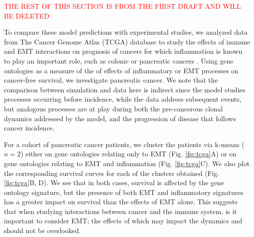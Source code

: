 \documentclass[11pt]{article}
\newcommand{\tcr} { \textcolor{red} }
\begin{document}
\tcr{THE REST OF THIS SECTION IS FROM THE FIRST DRAFT AND WILL BE DELETED}

\par 
To compare these model predictions with experimental studies, we analyzed data from The Cancer Genome Atlas (TCGA) database to study the effects of immune and EMT interactions on prognosis of cancers for which inflammation is known to play an important role, such as colonic or pancreatic cancers \cite{hu10_inflammationinduced, balkwill01_inflammation}. Using gene ontologies as a measure of the of effects of inflammatory or EMT processes on cancer-free survival, we investigate pancreatic cancer. We note that the comparison between simulation and data here is indirect since the model studies processes occurring before incidence, while the data address subsequent events, but analogous processes are at play during both the pre-cancerous clonal dynamics addressed by the model, and the progression of disease that follows cancer incidence. 
\par
For a cohort of pancreatic cancer patients, we cluster the patients via k-means ($n=2$) either on gene ontologies relating only to EMT (Fig. \ref{fig:tcga}A) or on gene ontologies relating to EMT and inflammation (Fig. \ref{fig:tcga}C).
We also plot the corresponding survival curves for each of the clusters obtained (Fig. \ref{fig:tcga}B, D).
We see that in both cases, survival is affected by the gene ontology signature, but the presence of both EMT and inflammatory signatures has a greater impact on survival than the effects of EMT alone.
This suggests that when studying interactions between cancer and the immune system, is it important to consider EMT; the effects of which may impact the dynamics and should not be overlooked.
\end{document}

